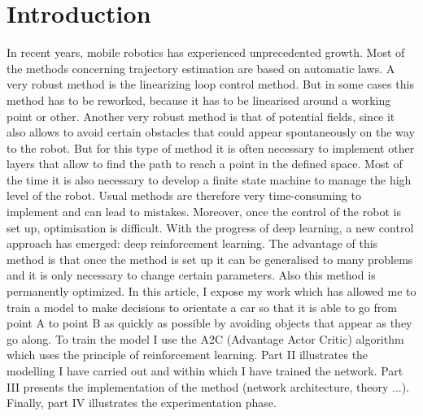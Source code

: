 \section*{Introduction}
In recent years, mobile robotics has experienced unprecedented growth. Most of the methods concerning trajectory estimation are based on automatic laws.
A very robust method is the linearizing loop control method. But in some cases this method has to be reworked, because it has to be linearised around a working point or other. 
Another very robust method is that of potential fields, since it also allows to avoid certain obstacles that could appear spontaneously on the way to the robot. 
But for this type of method it is often necessary to implement other layers that allow to find the path to reach a point in the defined space. 
Most of the time it is also necessary to develop a finite state machine to manage the high level of the robot. 
Usual methods are therefore very time-consuming to implement and can lead to mistakes. Moreover, once the control of the robot is set up, optimisation is difficult.
With the progress of deep learning, a new control approach has emerged: deep reinforcement learning.
The advantage of this method is that once the method is set up it can be generalised to many problems and it is only necessary to change certain parameters. Also this method is permanently optimized.
In this article, I expose my work which has allowed me to train a model to make decisions to orientate a car so that it is able to go from point A to point B as quickly as possible by avoiding objects \cite{avoidance} that appear as they go along.
To train the model I use the A2C (Advantage Actor Critic) algorithm which uses the principle of reinforcement learning.
Part II illustrates the modelling I have carried out and within which I have trained the network. Part III presents the implementation of the method (network architecture, theory ...).
Finally, part IV illustrates the experimentation phase.